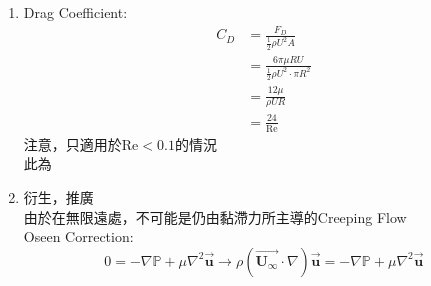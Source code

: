 \documentclass[../main.tex]{subfiles}
\begin{document}
\begin{itemize}
\begin{enumerate}
\begin{itemize}
\begin{align}
      &= \frac{3\mu U}{2R} \cdot \frac{4}{3} \nonumber\\
      &= \frac{2\mu U}{R}
    \end{align}
    \item 合併:
    \begin{align}
      F_z &= 2\pi R^2 \left\{
        0 + \left(
          \frac{2}{3}\rho g R + \frac{\mu U}{R}
        \right) + \frac{2\mu U}{R}
      \right\} \nonumber\\
      &= 2\pi R^2 \left(
        \frac{2}{3}\rho g R + \frac{3\mu U}{R}
      \right) \nonumber\\
      \Rightarrow\quad & \boxed{F_z = \frac{4}{3}\pi \rho g R^3 + 6\pi \mu U R} \label{eq:ch2_3_stokes_sphere_drag_force}
    \end{align}
    而第一項，就是球的體積乘上液體的密度(排開液體重)，也就是浮力\\
    第二項則可以拆成$2\pi \mu R U$和$4\pi \mu RU$兩部分\\
    前者是球體受到的$p$，後者是球體受到的$\tau_{r\theta}$剪力
    \begin{equation}
      \boxed{F_z = \underbrace{\frac{4}{3}\pi \rho g R^3}_{\text{Buoyancy}} 
      + \underbrace{2\pi \mu R U}_{\text{Form Drag}} + \underbrace{4\pi \mu R U}_{\text{Friction}}}
    \end{equation}
    而Drag Force就是後兩項的總和:
    \begin{equation}
      \boxed{F_D = 6\pi \mu R U}
    \end{equation}
  \end{itemize}
  \item Drag Coefficient:
    \begin{align}
      C_D &= \frac{F_D}{\frac{1}{2}\rho U^2 A} \nonumber\\
      &= \frac{6\pi \mu R U}{\frac{1}{2}\rho U^2 \cdot \pi R^2} \nonumber\\
      &= \frac{12\mu}{\rho U R} \nonumber\\
      &= \boxed{\frac{24}{\text{Re}}}
    \end{align}
    注意，只適用於$\text{Re} < 0.1$的情況\\
    此為
  \item 衍生，推廣\\
  由於在無限遠處，不可能是仍由黏滯力所主導的Creeping Flow\\
  Oseen Correction:
  \begin{equation}
    0 = -\nabla\mathbb{P} + \mu \nabla^2 \vec{\bm u} \to 
    \rho (\vec{\bm U_\infty} \cdot \nabla) \vec{\bm u} = -\nabla\mathbb{P} + \mu \nabla^2 \vec{\bm u}

\end{equation}
\end{enumerate}
\end{itemize}
\end{document}

